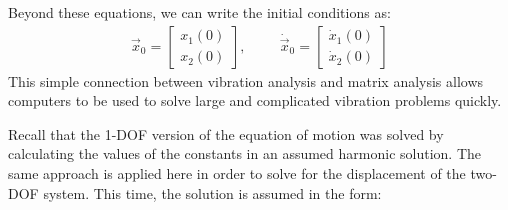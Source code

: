 \documentclass[12pt,letter]{article}
\begin{document}
	Beyond these equations, we can write the initial conditions as:
	\begin{eqnarray}
	\vec{x}_0=  \begin{bmatrix} x_1(0) \\  x_2(0) \end{bmatrix},  \hspace{1cm} \dot{\vec{x}}_0=  \begin{bmatrix} \dot{x}_1(0) \\  \dot{x}_2(0) \end{bmatrix}
	\end{eqnarray}
	This simple connection between vibration analysis and matrix analysis allows computers to be used to solve large and complicated vibration problems quickly.
	
	Recall that the 1-DOF version of the equation of motion was solved by calculating the values of the constants in an assumed harmonic solution. The same approach is applied here in order to solve for the displacement of the two-DOF system. This time, the solution is assumed in the form:
	
\end{document}
